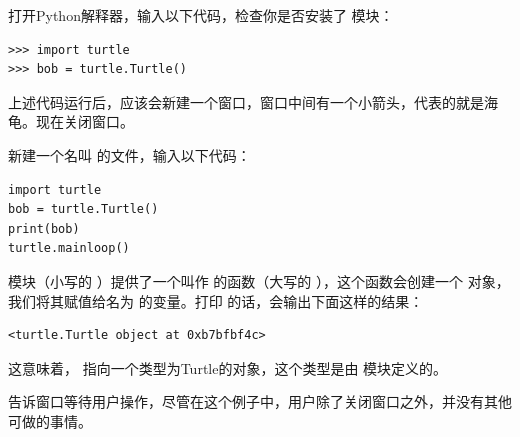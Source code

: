 打开Python解释器，输入以下代码，检查你是否安装了  模块：

\begin{lstlisting}
>>> import turtle
>>> bob = turtle.Turtle()
\end{lstlisting}


上述代码运行后，应该会新建一个窗口，窗口中间有一个小箭头，代表的就是海龟。现在关闭窗口。


新建一个名叫   的文件，输入以下代码：

\begin{lstlisting}
import turtle
bob = turtle.Turtle()
print(bob)
turtle.mainloop()
\end{lstlisting}


 模块（小写的  ）提供了一个叫作  的函数（大写的 ），这个函数会创建一个  对象，我们将其赋值给名为  的变量。打印  的话，会输出下面这样的结果：

\begin{lstlisting}
<turtle.Turtle object at 0xb7bfbf4c>
\end{lstlisting}


这意味着， 指向一个类型为Turtle的对象，这个类型是由  模块定义的。


 告诉窗口等待用户操作，尽管在这个例子中，用户除了关闭窗口之外，并没有其他可做的事情。


